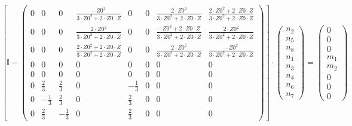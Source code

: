 \[ \left[ \mathbb{I}  - \left(\begin{array}{cccccccc} 0 & 0 & 0 & \frac{-Z0^2}{3\cdot Z0^2+2\cdot Z0\cdot Z} & 0 & 0 & \frac{2\cdot Z0^2}{3\cdot Z0^2+2\cdot Z0\cdot Z} & \frac{2\cdot Z0^2+2\cdot Z0\cdot Z}{3\cdot Z0^2+2\cdot Z0\cdot Z} \\ 0 & 0 & 0 & \frac{2\cdot Z0^2}{3\cdot Z0^2+2\cdot Z0\cdot Z} & 0 & 0 & \frac{-Z0^2+2\cdot Z0\cdot Z}{3\cdot Z0^2+2\cdot Z0\cdot Z} & \frac{2\cdot Z0^2}{3\cdot Z0^2+2\cdot Z0\cdot Z} \\ 0 & 0 & 0 & \frac{2\cdot Z0^2+2\cdot Z0\cdot Z}{3\cdot Z0^2+2\cdot Z0\cdot Z} & 0 & 0 & \frac{2\cdot Z0^2}{3\cdot Z0^2+2\cdot Z0\cdot Z} & \frac{-Z0^2}{3\cdot Z0^2+2\cdot Z0\cdot Z} \\ 0 & 0 & 0 & 0 & 0 & 0 & 0 & 0 \\ 0 & 0 & 0 & 0 & 0 & 0 & 0 & 0 \\ 0 & \frac{2}{3} & \frac{2}{3} & 0 & -\frac{1}{3} & 0 & 0 & 0 \\ 0 & -\frac{1}{3} & \frac{2}{3} & 0 & \frac{2}{3} & 0 & 0 & 0 \\ 0 & \frac{2}{3} & -\frac{1}{3} & 0 & \frac{2}{3} & 0 & 0 & 0 \end{array}\right)\right] \cdot \left(\begin{array}{c} n_{2} \\ n_{5} \\ n_{8} \\ n_{1} \\ n_{3} \\ n_{4} \\ n_{6} \\ n_{7} \end{array}\right) = \left(\begin{array}{c} 0 \\ 0 \\ 0 \\ m_{1} \\ m_{2} \\ 0 \\ 0 \\ 0 \end{array}\right) \]
